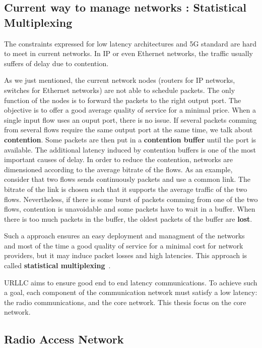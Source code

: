 \subsection{Current way to manage networks : Statistical Multiplexing}


The constraints expressed for low latency architectures and 5G standard are hard to meet in current networks. In IP or even Ethernet networks, the traffic usually suffers of delay due to contention. 

As we just mentioned, the current network nodes (routers for IP networks, switches for Ethernet networks) are not able to schedule packets. The only function of the nodes is to forward the packets to the right output port.
The objective is to offer a good average quality of service for a minimal price. When a single input flow uses an ouput port, there is no issue.
 If several packets comming from several flows require the same output port at the same time, we talk about \textbf{contention}. Some packets are then put in a \textbf{contention buffer} until the port is available. The additional latency induced by contention buffers is one of the most important causes of delay. In order to reduce the contention, networks are dimensioned according to the average bitrate of the flows. As an example, consider that two flows sends continuously packets and use a common link. The bitrate of the link is chosen such that it supports the average traffic of the two flows. Nevertheless, if there is some burst of packets comming from one of the two flows, contention is unavoidable and some packets have to wait in a buffer. When there is too much packets in the buffer, the oldest packets of the buffer are \textbf{lost}. 

Such a approach ensures an easy deployment and managment of the networks and most of the time a good quality of service for a minimal cost for network providers, but it may induce packet losses and high latencies. This approach is called \textbf{statistical multiplexing}~\cite{krishnamurthy2003latency,venkatramani1994supporting}. 

URLLC aims to ensure good end to end latency communications. To achieve such a goal, each component of the communication network must satisfy a low latency: the radio communications, and the core network. This thesis focus on the core network. 

\subsection{\textbf{R}adio \textbf{A}ccess \textbf{N}etwork}

